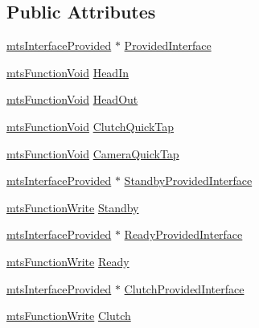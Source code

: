 \subsection*{Public Attributes}
\begin{DoxyCompactItemize}
\item 
\hyperlink{classmts_interface_provided}{mts\-Interface\-Provided} $\ast$ \hyperlink{classmts_intuitive_da_vinci_1_1_console_data_a0b3a28652722a634382d0d0ea5750e88}{Provided\-Interface}
\item 
\hyperlink{classmts_function_void}{mts\-Function\-Void} \hyperlink{classmts_intuitive_da_vinci_1_1_console_data_a5b5d17e216af2063349a16f4aaf1e9da}{Head\-In}
\item 
\hyperlink{classmts_function_void}{mts\-Function\-Void} \hyperlink{classmts_intuitive_da_vinci_1_1_console_data_a0be0b8a323ad2aa87d37651673d5f578}{Head\-Out}
\item 
\hyperlink{classmts_function_void}{mts\-Function\-Void} \hyperlink{classmts_intuitive_da_vinci_1_1_console_data_a761511254bd4bb7552555e087f62b896}{Clutch\-Quick\-Tap}
\item 
\hyperlink{classmts_function_void}{mts\-Function\-Void} \hyperlink{classmts_intuitive_da_vinci_1_1_console_data_acc1d6720edf3d31e415419be36318d5a}{Camera\-Quick\-Tap}
\item 
\hyperlink{classmts_interface_provided}{mts\-Interface\-Provided} $\ast$ \hyperlink{classmts_intuitive_da_vinci_1_1_console_data_a42526431899b8d287072e9db9a7f6e0e}{Standby\-Provided\-Interface}
\item 
\hyperlink{classmts_function_write}{mts\-Function\-Write} \hyperlink{classmts_intuitive_da_vinci_1_1_console_data_ac4e3b3234430ebffecd42aa75f26c1d9}{Standby}
\item 
\hyperlink{classmts_interface_provided}{mts\-Interface\-Provided} $\ast$ \hyperlink{classmts_intuitive_da_vinci_1_1_console_data_a38357629dbf987f86a238edf04235ace}{Ready\-Provided\-Interface}
\item 
\hyperlink{classmts_function_write}{mts\-Function\-Write} \hyperlink{classmts_intuitive_da_vinci_1_1_console_data_a0cb8ebe8516c19fac62e8911aaf4cde5}{Ready}
\item 
\hyperlink{classmts_interface_provided}{mts\-Interface\-Provided} $\ast$ \hyperlink{classmts_intuitive_da_vinci_1_1_console_data_af523bdb7ed11e8066fbb5d869fa309ee}{Clutch\-Provided\-Interface}
\item 
\hyperlink{classmts_function_write}{mts\-Function\-Write} \hyperlink{classmts_intuitive_da_vinci_1_1_console_data_a692cf3fce7a601b8fdbc88f65ccab22b}{Clutch}

\end{DoxyCompactItemize}
